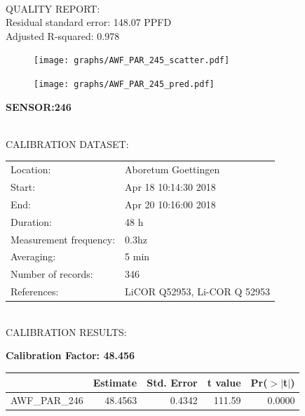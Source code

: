 \documentclass[oneside]{report}
\begin{document}
\hrulefill\\
QUALITY REPORT:\\
Residual standard error: 148.07 PPFD\\
Adjusted R-squared: 0.978



\begin{figure}[H]
  \centering
  \texttt{[image: graphs/AWF\_PAR\_245\_scatter.pdf]}
\end{figure}




\begin{figure}[H]
  \centering
  \texttt{[image: graphs/AWF\_PAR\_245\_pred.pdf]}
\end{figure}

\pagebreak


\begin{center}
\large{\textbf{SENSOR:246}}\\
\end{center}

\hrulefill\\
CALIBRATION DATASET:\\
\begin{table}[h!]
  \centering
  \label{tab:table1}
  \begin{tabular}{ll}
    Location: & Aboretum Goettingen\\ 
    
    
    Start:  & Apr 18 10:14:30 2018 \\
    End:   & Apr 20 10:16:00 2018\\ 
    Duration: & 48 h\\
    Measurement frequency: & 0.3hz\\
    Averaging:  &5 min\\
    Number of records: & 346 \\
    References: & LiCOR Q52953, Li-COR Q 52953 \\
  \end{tabular}
\end{table}

\hrulefill\\
CALIBRATION RESULTS:\\


\begin{center}
\textbf{\large{Calibration Factor: 48.456}}\\
\end{center}
\begin{table}[ht]
\centering
\begin{tabular}{rrrrr}
  \hline
 & Estimate & Std. Error & t value & Pr($>$$|$t$|$) \\ 
  \hline
AWF\_PAR\_246 & 48.4563 & 0.4342 & 111.59 & 0.0000 \\ 
   \hline
\end{tabular}
\end{table}
\end{document}
